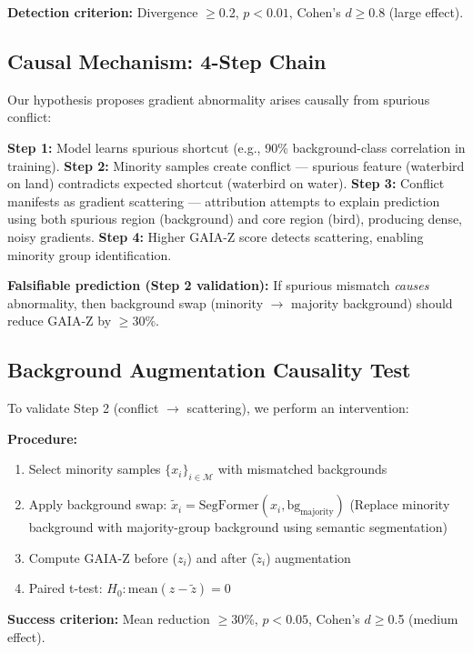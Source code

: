 \textbf{Detection criterion:} Divergence $\geq$0.2, $p<0.01$, Cohen's $d\geq$0.8 (large effect).

\subsection{Causal Mechanism: 4-Step Chain}

Our hypothesis proposes gradient abnormality arises causally from spurious conflict:

\textbf{Step 1:} Model learns spurious shortcut (e.g., 90\% background-class correlation in training).
\textbf{Step 2:} Minority samples create conflict --- spurious feature (waterbird on land) contradicts expected shortcut (waterbird on water).
\textbf{Step 3:} Conflict manifests as gradient scattering --- attribution attempts to explain prediction using both spurious region (background) and core region (bird), producing dense, noisy gradients.
\textbf{Step 4:} Higher GAIA-Z score detects scattering, enabling minority group identification.

\textbf{Falsifiable prediction (Step 2 validation):} If spurious mismatch \emph{causes} abnormality, then background swap (minority $\rightarrow$ majority background) should reduce GAIA-Z by $\geq$30\%.

\subsection{Background Augmentation Causality Test}

To validate Step 2 (conflict $\rightarrow$ scattering), we perform an intervention:

\textbf{Procedure:}
\begin{enumerate}
\item Select minority samples $\{x_i\}_{i \in \mathcal{M}}$ with mismatched backgrounds
\item Apply background swap: $\tilde{x}_i = \text{SegFormer}(x_i, \text{bg}_{\text{majority}})$
   (Replace minority background with majority-group background using semantic segmentation)
\item Compute GAIA-Z before ($z_i$) and after ($\tilde{z}_i$) augmentation
\item Paired t-test: $H_0: \text{mean}(z - \tilde{z}) = 0$
\end{enumerate}

\textbf{Success criterion:} Mean reduction $\geq$30\%, $p<0.05$, Cohen's $d\geq$0.5 (medium effect).

